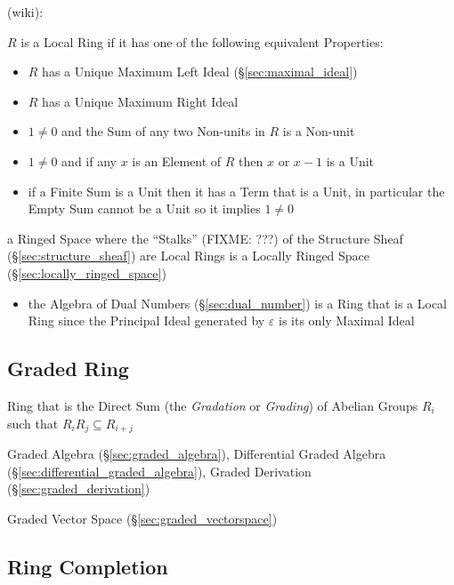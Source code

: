 (wiki):

$R$ is a Local Ring if it has one of the following equivalent Properties:
\begin{itemize}
  \item $R$ has a Unique Maximum Left Ideal (\S\ref{sec:maximal_ideal})
  \item $R$ has a Unique Maximum Right Ideal
  \item $1 \neq 0$ and the Sum of any two Non-units in $R$ is a Non-unit
  \item $1 \neq 0$ and if any $x$ is an Element of $R$ then $x$ or $x - 1$ is a
    Unit
  \item if a Finite Sum is a Unit then it has a Term that is a Unit, in
    particular the Empty Sum cannot be a Unit so it implies $1 \neq 0$
\end{itemize}

a Ringed Space where the ``Stalks'' (FIXME: ???) of the Structure Sheaf
(\S\ref{sec:structure_sheaf}) are Local Rings is a Locally Ringed Space
(\S\ref{sec:locally_ringed_space})

\begin{itemize}
  \item the Algebra of Dual Numbers (\S\ref{sec:dual_number}) is a Ring that is
    a Local Ring since the Principal Ideal generated by $\varepsilon$ is its
    only Maximal Ideal
\end{itemize}


\subsection{Graded Ring}\label{sec:graded_ring}

Ring that is the Direct Sum (the \emph{Gradation} or \emph{Grading}) of Abelian
Groups $R_i$ such that $R_iR_j \subseteq R_{i+j}$

Graded Algebra (\S\ref{sec:graded_algebra}),
Differential Graded Algebra (\S\ref{sec:differential_graded_algebra}),
Graded Derivation (\S\ref{sec:graded_derivation})

Graded Vector Space (\S\ref{sec:graded_vectorspace})



\subsection{Ring Completion}\label{sec:ring_completion}

